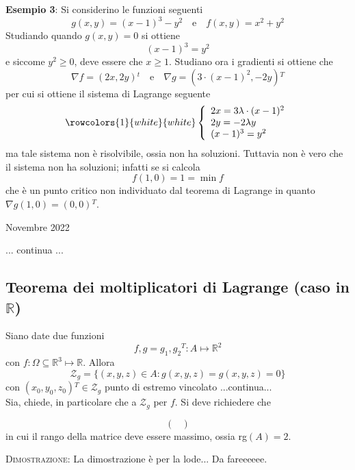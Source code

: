 \documentclass[a4paper]{extarticle}
\begin{document}
\vspace{1em}
\noindent
\textbf{Esempio 3}: Si considerino le funzioni seguenti
\[g(x,y) = (x-1)^3 - y^2 \hspace{1em} \text{e} \hspace{1em} f(x,y) = x^2 + y^2\]
Studiando quando $g(x,y)=0$ si ottiene
\[(x-1)^3 = y^2\]
e siccome $y^2 \geq 0$, deve essere che $x \geq 1$. Studiano ora i gradienti si ottiene che
\[\nabla f = (2x,2y){^t} \hspace{1em} \text{e} \hspace{1em} \nabla g = (3 \cdot (x-1)^2, -2y){^T}\]
per cui si ottiene il sistema di Lagrange seguente
\[
    \rowcolors{1}{white}{white}
    \left\{
    \begin{array}{l}
        2x=3\lambda \cdot (x-1)^2\\
        2y = -2 \lambda y\\
        (x-1)^3 = y^2
    \end{array}
    \right.
\]
ma tale sistema non è risolvibile, ossia non ha soluzioni. Tuttavia non è vero che il sistema non ha soluzioni; infatti se si calcola
\[f(1,0)=1=\min f\]
che è un punto critico non individuato dal teorema di Lagrange in quanto $\nabla g(1,0) = (0,0){^T}$.

 Novembre 2022

\vspace{1em}
\noindent
... continua ...

\vspace{2em}
\subsection{Teorema dei moltiplicatori di Lagrange (caso in $\mathbb{R}$)}
Siano date due funzioni
\[f,g = {g_1, g_2}{^T} : A \longmapsto \mathbb{R}^2\]
con $f : \Omega \subseteq \mathbb{R}^3 \longmapsto \mathbb{R}$. Allora
\[\mathcal{Z}_g = \{(x,y,z) \in A : g(x,y,z) = g(x,y,z) = 0\}\]
con $(x_0,y_0,z_0){^T} \in \mathcal{Z}_g$ punto di estremo vincolato ...continua...\\
Sia, chiede, in particolare che a $\mathcal{Z}_g$ per $f$. Si deve richiedere che

\[
    \left(
        \begin{array}{ccc}

        \end{array}
    \right)
\]
in cui il rango della matrice deve essere massimo, ossia rg$(A)=2$.

\vspace{2em}
\noindent
\normalfont \normalsize
\textsc{Dimostrazione}: La dimostrazione è per la lode... Da fareeeeee.
\end{document}

